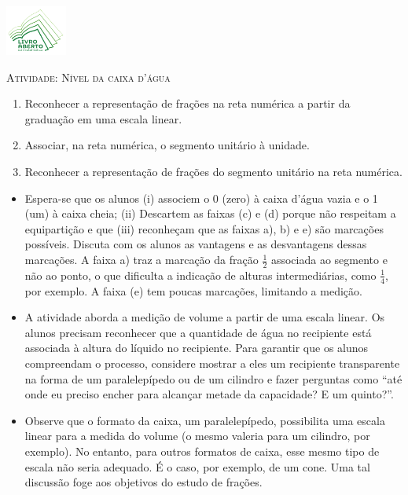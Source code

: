 \documentclass[10 pt,usenames,dvipsnames, oneside]{article}
\begin{document}
\begin{center}
  \begin{minipage}[l]{3cm}
\includegraphics[width=2cm]{../../../Figuras/logo}       
\end{minipage}\hfill
\begin{minipage}[r]{.8\textwidth}
 {\Large \scshape Atividade: Nível da caixa d'água}  
\end{minipage}
\end{center}
\vspace{.2cm}

\ifdefined\prof
\begin{goals}
\begin{enumerate}
    \item Reconhecer a representação de frações na reta numérica a partir da graduação em uma escala linear.
    \item Associar,  na reta numérica, o segmento unitário à unidade.
    \item Reconhecer a representação de frações do segmento unitário na reta numérica.
\end{enumerate}

\tcblower

\begin{itemize}
\item Espera-se que os alunos (i) associem o 0 (zero) à caixa d'água vazia e o 1 (um) à caixa cheia; (ii) Descartem as faixas (c) e (d) porque não respeitam a equipartição e que (iii) reconheçam que as faixas a), b) e e) são marcações possíveis. Discuta com os alunos as vantagens e as desvantagens dessas marcações. A faixa a) traz a marcação da fração $\frac{1}{2}$ associada ao segmento e não ao ponto, o que dificulta a indicação de alturas intermediárias, como $\frac{1}{4}$, por exemplo. A faixa (e) tem poucas marcações, limitando a medição.
\item A atividade aborda a medição de volume a partir de uma escala linear. Os alunos precisam reconhecer que a quantidade de água no recipiente está associada à altura do líquido no recipiente. Para garantir que os alunos compreendam o processo, considere mostrar a eles um recipiente transparente na forma de um paralelepípedo ou de um cilindro e fazer perguntas como ``até onde eu preciso encher para alcançar metade da capacidade? E um quinto?''.
\item Observe que o formato da caixa, um paralelepípedo, possibilita uma escala linear para a medida do volume (o mesmo valeria para um cilindro, por exemplo). No entanto, para outros formatos de caixa, esse mesmo tipo de escala não seria adequado. É o caso, por exemplo, de um cone. Uma tal discussão foge aos objetivos do estudo de frações.
\end{itemize}
\end{goals}
\end{document}
